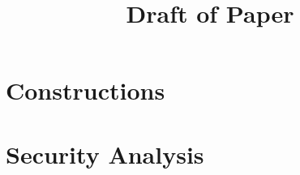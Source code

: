 \documentclass{article}
\title{Draft of Paper}
\begin{document}
\begin{comment}
\section{Introduction}



\section{Notation}



\section{g-leakage}



\section{Syntax of Searchable Encrypted Database}



\section{Security Notions} \label{Security Notions}

\end{comment}

\section{Constructions}



\section{Security Analysis}







{}
\end{document}
